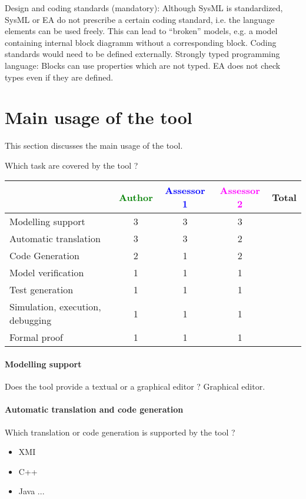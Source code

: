 \begin{assessor2}
Design and coding standards (mandatory): Although SysML is standardized, SysML or EA do not prescribe a certain coding standard, i.e. the language elements can be used freely. This can lead to "`broken"' models, e.g. a model containing internal block diagramm without a corresponding block. Coding standards would need to be defined externally.
Strongly typed programming language: Blocks can use properties which are not typed. EA does not check types even if they are defined.
\end{assessor2}


\section{Main usage of the tool}
\label{main_usage}

This section discusses the main usage of the tool.

Which task are covered by the tool ?


\begin{tabular}{|l | c | c | c | c|}
\hline
& \textcolor{green}{Author} & \textcolor{blue}{Assessor 1} & \textcolor{magenta}{Assessor 2} & Total \\
\hline 
Modelling support &3 & 3& 3&  \\
\hline
Automatic translation  &3 & 3& 2& \\
\hline
Code Generation  &2 & 1& 2& \\
\hline
Model verification &1 & 1& 1& \\
\hline
Test generation &1 & 1& 1& \\
\hline
Simulation, execution, debugging &1 & 1& 1& \\
\hline
Formal proof &1 & 1& 1& \\
\hline
\end{tabular}

\paragraph{Modelling support}
Does the tool provide a  textual or a graphical editor ? Graphical editor.

\paragraph{Automatic translation and code generation}
Which translation or code generation is supported by the tool ?
\begin{itemize}
\item XMI
\item C++
\item Java ...
\end{itemize}
